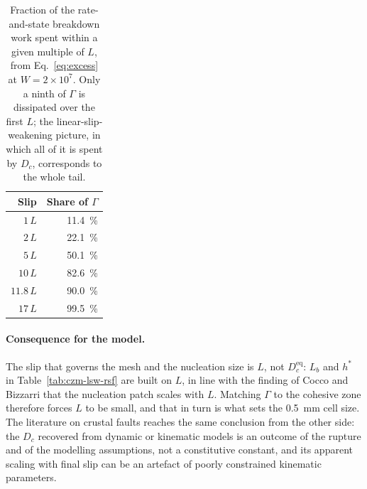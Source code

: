 \documentclass[11pt]{article}
\begin{document}
\begin{table}[htbp]
  \centering
  \footnotesize
  \caption{Fraction of the rate-and-state breakdown work spent within a given
  multiple of $L$, from Eq.~\eqref{eq:excess} at $W = 2\times10^{7}$. Only a
  ninth of $\Gamma$ is dissipated over the first $L$; the linear-slip-weakening
  picture, in which all of it is spent by $D_c$, corresponds to the whole tail.}
  \label{tab:gamma-partition}
  \begin{tabular}{@{}r r@{}}
    \toprule
    Slip & Share of $\Gamma$ \\
    \midrule
    $1\,L$    & \SI{11.4}{\percent} \\
    $2\,L$    & \SI{22.1}{\percent} \\
    $5\,L$    & \SI{50.1}{\percent} \\
    $10\,L$   & \SI{82.6}{\percent} \\
    $11.8\,L$ & \SI{90.0}{\percent} \\
    $17\,L$   & \SI{99.5}{\percent} \\
    \bottomrule
  \end{tabular}
\end{table}

\paragraph{Consequence for the model.}
The slip that governs the mesh and the nucleation size is $L$, not
$D_c^{\mathrm{eq}}$: $L_b$ and $h^{*}$ in Table~\ref{tab:czm-lsw-rsf} are built
on $L$, in line with the finding of Cocco and Bizzarri that the nucleation patch
scales with $L$. Matching $\Gamma$ to the cohesive zone therefore forces
$L$ to be small, and that in turn is what sets the \SI{0.5}{\milli\meter} cell
size. The literature on crustal faults reaches the same conclusion from the
other side: the $D_c$ recovered from dynamic or kinematic models is an outcome
of the rupture and of the modelling assumptions, not a constitutive constant,
and its apparent scaling with final slip can be an artefact of poorly
constrained kinematic parameters.
\end{document}
